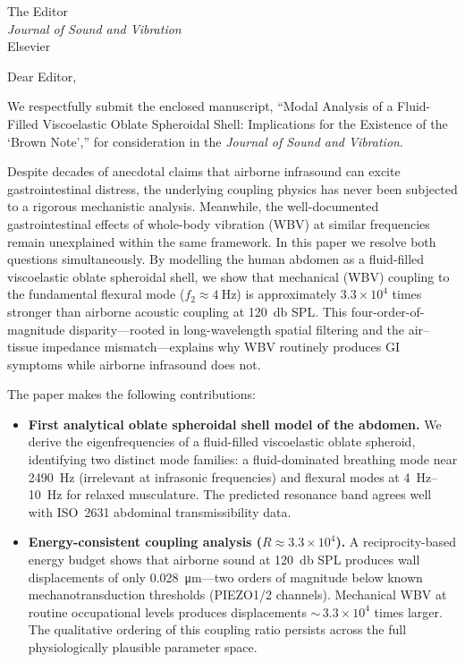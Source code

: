 \documentclass[11pt]{letter}
\begin{document}
\begin{letter}{%
  The Editor\\
  \textit{Journal of Sound and Vibration}\\
  Elsevier}

\opening{Dear Editor,}

We respectfully submit the enclosed manuscript, ``Modal Analysis of a
Fluid-Filled Viscoelastic Oblate Spheroidal Shell: Implications for the
Existence of the `Brown Note','' for consideration in the
\textit{Journal of Sound and Vibration}.

Despite decades of anecdotal claims that airborne infrasound can excite
gastrointestinal distress, the underlying coupling physics has never been
subjected to a rigorous mechanistic analysis.  Meanwhile, the well-documented
gastrointestinal effects of whole-body vibration (WBV) at similar frequencies
remain unexplained within the same framework.  In this paper we resolve both
questions simultaneously.  By modelling the human abdomen as a fluid-filled
viscoelastic oblate spheroidal shell, we show that mechanical (WBV) coupling
to the fundamental flexural mode ($f_2 \approx \SI{4}{\hertz}$) is
approximately $3.3 \times 10^4$ times stronger than airborne acoustic coupling at
\SI{120}{\decibel} SPL.  This four-order-of-magnitude disparity---rooted in
long-wavelength spatial filtering and the air--tissue impedance
mismatch---explains why WBV routinely
produces GI symptoms while airborne infrasound does not.

The paper makes the following contributions:

\begin{itemize}
  \item \textbf{First analytical oblate spheroidal shell model of the abdomen.}
    We derive the eigenfrequencies of a fluid-filled viscoelastic oblate
    spheroid, identifying two distinct mode families: a fluid-dominated
    breathing mode near \SI{2490}{\hertz} (irrelevant at infrasonic frequencies)
    and flexural modes at \SIrange{4}{10}{\hertz} for relaxed musculature.
    The predicted resonance band agrees well with ISO~2631 abdominal
    transmissibility data.

  \item \textbf{Energy-consistent coupling analysis ($R \approx 3.3 \times 10^4$).}
    A reciprocity-based energy budget shows that airborne sound at
    \SI{120}{\decibel} SPL produces wall displacements of only
    \SI{0.028}{\micro\metre}---two orders of magnitude below known
    mechanotransduction thresholds (PIEZO1/2 channels).  Mechanical WBV at
    routine occupational levels produces displacements ${\sim}\,3.3 \times 10^4$ times
    larger.  The qualitative ordering of this coupling ratio persists across the
    full physiologically plausible parameter space.


\end{itemize}
\end{letter}
\end{document}
